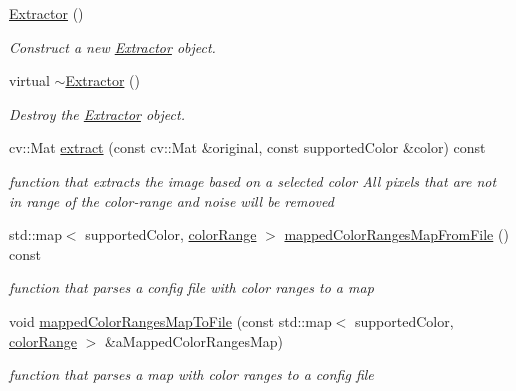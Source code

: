 \begin{DoxyCompactItemize}
\item 
\hyperlink{classExtractor_a2726e6a94c51c2b2dbc518199d054103}{Extractor} ()\hypertarget{classExtractor_a2726e6a94c51c2b2dbc518199d054103}{}\label{classExtractor_a2726e6a94c51c2b2dbc518199d054103}

\begin{DoxyCompactList}\small\item\em Construct a new \hyperlink{classExtractor}{Extractor} object. \end{DoxyCompactList}\item 
virtual \hyperlink{classExtractor_a0da249c590c92ed0714e8bd69ac236f4}{$\sim$\+Extractor} ()\hypertarget{classExtractor_a0da249c590c92ed0714e8bd69ac236f4}{}\label{classExtractor_a0da249c590c92ed0714e8bd69ac236f4}

\begin{DoxyCompactList}\small\item\em Destroy the \hyperlink{classExtractor}{Extractor} object. \end{DoxyCompactList}\item 
cv\+::\+Mat \hyperlink{classExtractor_a89c360e740a37c38e6ef23185f5cb862}{extract} (const cv\+::\+Mat \&original, const supported\+Color \&color) const 
\begin{DoxyCompactList}\small\item\em function that extracts the image based on a selected color All pixels that are not in range of the color-\/range and noise will be removed \end{DoxyCompactList}\item 
std\+::map$<$ supported\+Color, \hyperlink{structcolorRange}{color\+Range} $>$ \hyperlink{classExtractor_ab48284118c37aff704e714f9a6da1331}{mapped\+Color\+Ranges\+Map\+From\+File} () const 
\begin{DoxyCompactList}\small\item\em function that parses a config file with color ranges to a map \end{DoxyCompactList}\item 
void \hyperlink{classExtractor_adfd9ce2b8cee262883ee94a5e27e1d69}{mapped\+Color\+Ranges\+Map\+To\+File} (const std\+::map$<$ supported\+Color, \hyperlink{structcolorRange}{color\+Range} $>$ \&a\+Mapped\+Color\+Ranges\+Map)
\begin{DoxyCompactList}\small\item\em function that parses a map with color ranges to a config file \end{DoxyCompactList}\end{DoxyCompactItemize}


